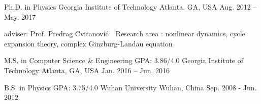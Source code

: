 


\begin{cventries}

\cveducation
{Ph.D. in Physics}
{}
{Georgia Institute of Technology}
{Atlanta, GA, USA}
{Aug. 2012 -- May. 2017}
{
  \begin{cvitems}
    \item adviser: Prof. Predrag Cvitanovi\'c \quad \quad 
    \bullet \,\, Research area : nonlinear dynamics, cycle expansion theory,
      complex Ginzburg-Landau equation
  \end{cvitems}
}


\cveducation
{M.S. in Computer Science \& Engineering }
{GPA: 3.86/4.0}
{Georgia Institute of Technology}
{Atlanta, GA, USA}
{Jan. 2016 -- Jun. 2016}
{
}
\vspace{-0.5em}

\cveducation
{B.S. in Physics} %
{GPA: 3.75/4.0}
{Wuhan University} %
{Wuhan, China} %
{Sep. 2008 - Jun. 2012} %
{    
}
\vspace{-0.5em}



\end{cventries}
